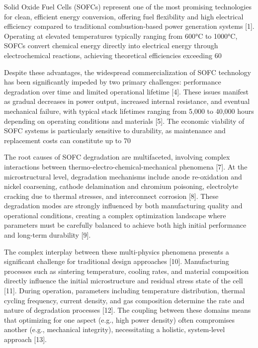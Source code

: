 \documentclass[10pt,conference]{IEEEtran}
\begin{document}
Solid Oxide Fuel Cells (SOFCs) represent one of the most promising technologies for clean, efficient energy conversion, offering fuel flexibility and high electrical efficiency compared to traditional combustion-based power generation systems [1]. Operating at elevated temperatures typically ranging from 600°C to 1000°C, SOFCs convert chemical energy directly into electrical energy through electrochemical reactions, achieving theoretical efficiencies exceeding 60%

Despite these advantages, the widespread commercialization of SOFC technology has been significantly impeded by two primary challenges: performance degradation over time and limited operational lifetime [4]. These issues manifest as gradual decreases in power output, increased internal resistance, and eventual mechanical failure, with typical stack lifetimes ranging from 5,000 to 40,000 hours depending on operating conditions and materials [5]. The economic viability of SOFC systems is particularly sensitive to durability, as maintenance and replacement costs can constitute up to 70%

The root causes of SOFC degradation are multifaceted, involving complex interactions between thermo-electro-chemical-mechanical phenomena [7]. At the microstructural level, degradation mechanisms include anode re-oxidation and nickel coarsening, cathode delamination and chromium poisoning, electrolyte cracking due to thermal stresses, and interconnect corrosion [8]. These degradation modes are strongly influenced by both manufacturing quality and operational conditions, creating a complex optimization landscape where parameters must be carefully balanced to achieve both high initial performance and long-term durability [9].

The complex interplay between these multi-physics phenomena presents a significant challenge for traditional design approaches [10]. Manufacturing processes such as sintering temperature, cooling rates, and material composition directly influence the initial microstructure and residual stress state of the cell [11]. During operation, parameters including temperature distribution, thermal cycling frequency, current density, and gas composition determine the rate and nature of degradation processes [12]. The coupling between these domains means that optimizing for one aspect (e.g., high power density) often compromises another (e.g., mechanical integrity), necessitating a holistic, system-level approach [13].
\end{document}
